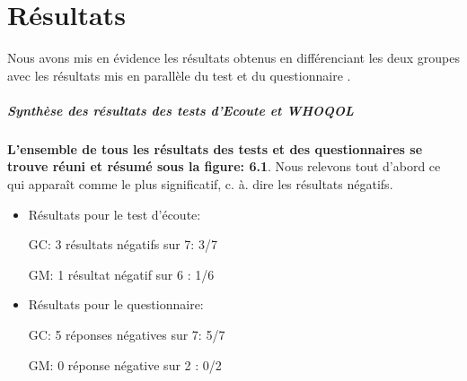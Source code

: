  	
 	
 
%                                 
                                 
  
  
   \chapter{Résultats}
   Nous avons mis en évidence les résultats obtenus en différenciant les deux groupes avec les résultats 
   mis en parallèle du test et du questionnaire .
   
    \paragraph{Synthèse  des résultats  des tests d'Ecoute et WHOQOL}
    
 
  \textbf{L'ensemble de tous les résultats des tests et des questionnaires se trouve réuni et résumé 
  	sous  la figure:  6.1}. Nous relevons tout d'abord ce qui apparaît comme le plus significatif, c. à. dire les 
  	résultats négatifs.
   \begin{itemize}
  	 \item Résultats pour le test d'écoute: 
  
  GC: 3 résultats négatifs sur 7:       3/7 
  
  
  GM: 1 résultat  négatif sur 6    :       1/6
  \item Résultats pour le questionnaire:    
  
   GC: 5 réponses négatives sur 7:       5/7 
   
   
  GM: 0 réponse négative sur 2    :       0/2
   \end{itemize}


